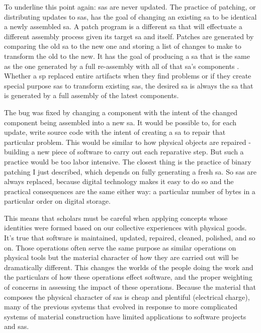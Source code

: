 \documentclass[a4paper,man,natbib,floatsintext]{apa6}
\begin{document}
   To underline this point again: \glspl{sa} are never updated. The practice of patching, or distributing updates to \glspl{sa}, has the goal of changing an existing \gls{sa} to be identical a newly assembled \gls{sa}. A patch program is a different \gls{sa} that will effectuate a different assembly process given its target \gls{sa} and itself. Patches are generated by comparing the old \gls{sa} to the new one and storing a list of changes to make to transform the old to the new. It has the goal of producing a \gls{sa} that is the same as the one generated by a full re-assembly with all of that \gls{sa}'s components \citep{Endsley_undated-iy}. Whether a \gls{sp} replaced entire artifacts when they find problems or if they create special purpose \glspl{sa} to transform existing \glspl{sa}, the desired \gls{sa} is always the \gls{sa} that is generated by a full assembly of the latest components.

   The bug was fixed by changing a component with the intent of the changed component being assembled into a new \gls{sa}. It would be possible to, for each update, write source code with the intent of creating a \gls{sa} to repair that particular problem. This would be similar to how physical objects are repaired - building a new piece of software to carry out each reparative step. But such a practice would be too labor intensive. The closest thing is the practice of binary patching I just described, which depends on fully generating a fresh \gls{sa}. So \glspl{sa} are always replaced, because digital technology makes it easy to do so and the practical consequences are the same either way: a particular number of bytes in a particular order on digital storage. 

   This means that scholars must be careful when applying concepts whose identities were formed based on our collective experiences with physical goods. It's true that software is maintained, updated, repaired, cleaned, polished, and so on. Those operations often serve the same purpose as similar operations on physical tools but the material character of how they are carried out will be dramatically different. This changes the worlds of the people doing the work and the particulars of how these operations effect software, and the proper weighting of concerns in assessing the impact of these operations. Because the material that composes the physical character of \glspl{sa} is cheap and plentiful (electrical charge), many of the previous systems that evolved in response to more complicated systems of material construction have limited applications to software projects and \glspl{sa}.
\end{document}
